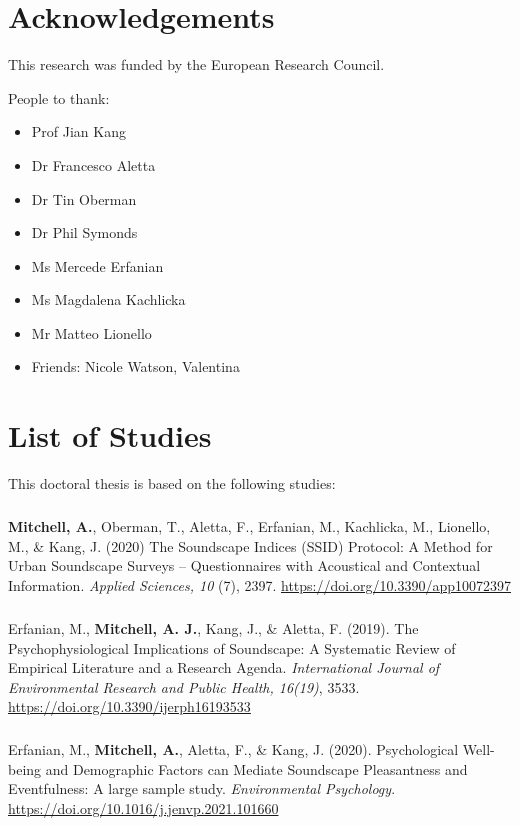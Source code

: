 \documentclass[twoside,fontsize=12pt,titlepage,chapterprefix=true
]{scrbook}
\begin{document}
\chapter*{Acknowledgements}
This research was funded by the European Research Council.

People to thank:
\begin{itemize}
      \item Prof Jian Kang
      \item Dr Francesco Aletta
      \item Dr Tin Oberman
      \item Dr Phil Symonds
      \item Ms Mercede Erfanian
      \item Ms Magdalena Kachlicka
      \item Mr Matteo Lionello
      \item Friends: Nicole Watson, Valentina
\end{itemize}

\chapter*{List of Studies}

This doctoral thesis is based on the following studies:

\paragraph*{}
\textbf{Mitchell, A.}, Oberman, T., Aletta, F., Erfanian, M., Kachlicka, M., Lionello, M., \& Kang, J. (2020) The Soundscape Indices (SSID) Protocol: A Method for Urban Soundscape Surveys -- Questionnaires with Acoustical and Contextual Information. \emph{Applied Sciences, 10} (7), 2397. \url{https://doi.org/10.3390/app10072397}

\paragraph*{}
Erfanian, M., \textbf{Mitchell, A. J.}, Kang, J., \& Aletta, F. (2019). The Psychophysiological Implications of Soundscape: A Systematic Review of Empirical Literature and a Research Agenda. \emph{International Journal of Environmental Research and Public Health, 16(19)}, 3533. \url{https://doi.org/10.3390/ijerph16193533}

\paragraph*{}
Erfanian, M., \textbf{Mitchell, A.}, Aletta, F., \& Kang, J. (2020). Psychological Well-being and Demographic Factors can Mediate Soundscape Pleasantness and Eventfulness: A large sample study. \emph{Environmental Psychology}. \url{https://doi.org/10.1016/j.jenvp.2021.101660}
\end{document}
